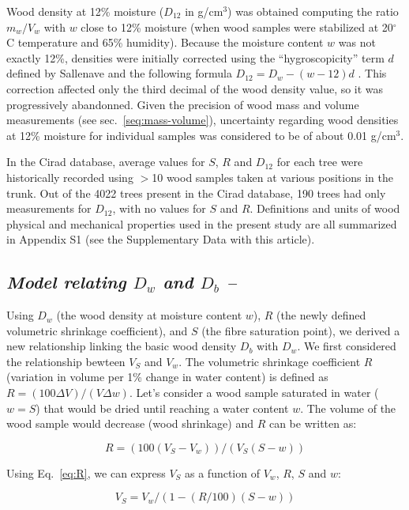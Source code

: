 \documentclass[a4paper, 12pt, leqno, dvipsnames]{article}\usepackage[]{graphicx}\usepackage[]{color}
\begin{document}
Wood density at 12\% moisture ($D_{12}$ in g/cm$^3$) was obtained computing the ratio $m_w/V_w$ with $w$ close to 12\% moisture (when wood samples were stabilized at 20$^\circ$C temperature and 65\% humidity). Because the moisture content $w$ was not exactly 12\%, densities were initially corrected using the ``hygroscopicity'' term $d$ defined by Sallenave and the following formula $D_{12}=D_w-(w-12)d$ \citep{Sallenave1971}. This correction affected only the third decimal of the wood density value, so it was progressively abandonned. Given the precision of wood mass and volume measurements (see sec.~\ref{seq:mass-volume}), uncertainty regarding wood densities at 12\% moisture for individual samples was considered to be of about 0.01 g/cm$^3$.

In the Cirad database, average values for $S$, $R$ and $D_{12}$ for each tree were historically recorded using $>$10 wood samples taken at various positions in the trunk. Out of the 4022 trees present in the Cirad database, 190 trees had only measurements for $D_{12}$, with no values for $S$ and $R$. Definitions and units of wood physical and mechanical properties used in the present study are all summarized in Appendix S1 (see the Supplementary Data with this article).

\subsection*{\textit{Model relating $D_{w}$ and $D_b$ --}}

Using $D_{w}$ (the wood density at moisture content $w$), $R$ (the newly defined volumetric shrinkage coefficient), and $S$ (the fibre saturation point), we derived a new relationship linking the basic wood density $D_b$ with $D_w$. We first considered the relationship bewteen $V_S$ and $V_w$. The volumetric shrinkage coefficient $R$ (variation in volume per 1\% change in water content) is defined as $R=(100 \Delta V) / (V \Delta w)$. Let's consider a wood sample saturated in water ($w=S$) that would be dried until reaching a water content $w$. The volume of the wood sample would decrease (wood shrinkage) and $R$ can be written as: 

\begin{equation}
  R=(100(V_S-V_w))/(V_S(S-w))
  \label{eq:R}
\end{equation}

Using Eq.~\ref{eq:R}, we can express $V_S$ as a function of $V_w$, $R$, $S$ and $w$:

\begin{equation}
  V_S=V_w/(1-(R/100)(S-w))
  \label{eq:V_S}
\end{equation}
\end{document}
